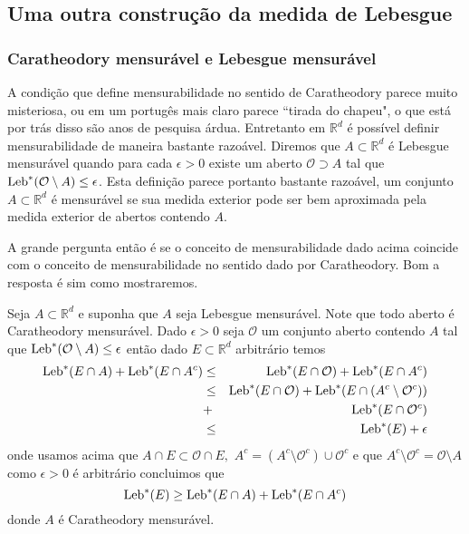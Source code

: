 \subsection*{Uma outra construç\~ao da medida de Lebesgue}













\subsubsection{Caratheodory mensur\'avel e Lebesgue mensur\'avel}




A condição que define mensurabilidade no sentido de Caratheodory parece muito misteriosa, ou em um portugês mais claro 
parece ``tirada do chapeu", o que está por trás disso são anos de pesquisa árdua. Entretanto em $\mathbb{R}^d$ é possível definir mensurabilidade de maneira bastante razoável. Diremos que $A\subset \mathbb{R}^d$ é Lebesgue  mensurável quando para cada  $\epsilon>0$ existe um aberto $\mathcal{O}\supset A$ tal que $\textnormal{Leb}^{*}(\mathcal{O}\setminus A)\leq \epsilon$. Esta definição parece portanto bastante razoável, um conjunto $A\subset \mathbb{R}^d$ é mensurável se sua medida exterior  pode ser bem aproximada pela medida exterior de abertos contendo $A$.

A grande pergunta então é se o conceito de mensurabilidade dado acima coincide com o conceito de mensurabilidade 
no sentido dado por Caratheodory. Bom  a resposta é sim como mostraremos.



Seja $A\subset \mathbb{R}^d$ e suponha que $A$ seja Lebesgue mensurável. Note que todo aberto  é Caratheodory mensurável. Dado $\epsilon>0$ seja $\mathcal{O}$ um conjunto aberto contendo $A$ tal que $\textnormal{Leb}^{*}(\mathcal{O}\setminus A)\leq \epsilon$  então dado $E\subset \mathbb{R}^d$ arbitrário temos 
\begin{eqnarray*}
\textnormal{Leb}^{*}(E\cap A)+\textnormal{Leb}^{*}(E\cap A^c)&\leq& \textnormal{Leb}^{*}(E\cap \mathcal{O})+\textnormal{Leb}^{*}(E\cap A^c)
\\
&
\leq 
&
\textnormal{Leb}^{*}(E\cap\mathcal{O})+
\textnormal{Leb}^{*}(E\cap (A^c\setminus \mathcal{O}^c))
\\
&
+
&
 \textnormal{Leb}^{*}(E\cap \mathcal{O}^c)
 \\
 &
 \leq 
 &
\textnormal{Leb}^{*}(E)+\epsilon
\end{eqnarray*}
onde usamos acima que $A\cap E\subset \mathcal{O}\cap E,$ $A^c=(A^c\setminus \mathcal{O}^c)\cup \mathcal{O}^c$ e que 
$A^c\setminus \mathcal{O}^c=\mathcal{O}\setminus A$ como $\epsilon>0$ é arbitrário concluimos que
$$
\textnormal{Leb}^{*}(E)\geq \textnormal{Leb}^{*}(E\cap A)+\textnormal{Leb}^{*}(E\cap A^c)
$$
donde $A$ é Caratheodory mensurável.


